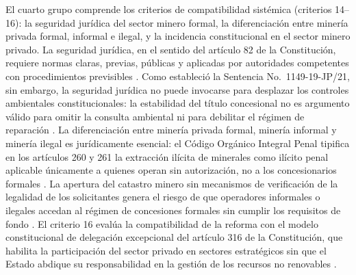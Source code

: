El cuarto grupo comprende los criterios de compatibilidad sistémica (criterios 14--16): la seguridad jurídica del sector minero formal, la diferenciación entre minería privada formal, informal e ilegal, y la incidencia constitucional en el sector minero privado. La seguridad jurídica, en el sentido del artículo 82 de la Constitución, requiere normas claras, previas, públicas y aplicadas por autoridades competentes con procedimientos previsibles \parencite{cre_2008}. Como estableció la Sentencia No.\ 1149-19-JP/21, sin embargo, la seguridad jurídica no puede invocarse para desplazar los controles ambientales constitucionales: la estabilidad del título concesional no es argumento válido para omitir la consulta ambiental ni para debilitar el régimen de reparación \parencite{cce_1149_19_jp_21,villacis_calvas_2022}. La diferenciación entre minería privada formal, minería informal y minería ilegal es jurídicamente esencial: el Código Orgánico Integral Penal tipifica en los artículos 260 y 261 la extracción ilícita de minerales como ilícito penal aplicable únicamente a quienes operan sin autorización, no a los concesionarios formales \parencite{coip_2014,robalino_altamirano_2025}. La apertura del catastro minero sin mecanismos de verificación de la legalidad de los solicitantes genera el riesgo de que operadores informales o ilegales accedan al régimen de concesiones formales sin cumplir los requisitos de fondo \parencite{arcom_resolucion_0029_2025,condoy_viera_2025}. El criterio 16 evalúa la compatibilidad de la reforma con el modelo constitucional de delegación excepcional del artículo 316 de la Constitución, que habilita la participación del sector privado en sectores estratégicos sin que el Estado abdique su responsabilidad en la gestión de los recursos no renovables \parencite{cre_2008,plan_nacional_sector_minero_2020}.

